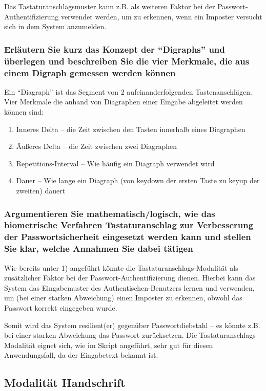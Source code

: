\documentclass{article}
\begin{document}
Das Tastaturanschlagsmuster kann z.B. als weiteren Faktor bei der Passwort-Authentifizierung verwendet werden, um zu 
erkennen, wenn ein Imposter versucht sich in dem System anzumelden.

\subsubsection{Erläutern Sie kurz das Konzept der ``Digraphs'' und überlegen und beschreiben Sie die vier Merkmale, die aus einem Digraph gemessen werden können}

Ein ``Diagraph'' ist das Segment von 2 aufeinanderfolgenden Tastenanschlägen.
Vier Merkmale die anhand von Diagraphen einer Eingabe abgeleitet werden können sind:

\begin{enumerate}
	\item Inneres Delta – die Zeit zwischen den Tasten innerhalb eines Diagraphen
	\item Äußeres Delta – die Zeit zwischen zwei Diagraphen
	\item Repetitions-Interval – Wie häufig ein Diagraph verwendet wird
	\item Dauer – Wie lange ein Diagraph (von keydown der ersten Taste zu keyup der zweiten) dauert
\end{enumerate}

\subsubsection{Argumentieren Sie mathematisch/logisch, wie das biometrische Verfahren Tastaturanschlag zur Verbesserung der Passwortsicherheit eingesetzt werden kann und stellen Sie klar, welche Annahmen Sie dabei tätigen}

Wie bereits unter 1) angeführt könnte die Tastaturanschlags-Modalität als zusätzlicher Faktor bei der 
Passwort-Authentifizierung dienen. Hierbei kann das System das Eingabemuster des Authentischen-Benutzers lernen und
verwenden, um (bei einer starken Abweichung) einen Imposter zu erkennen, obwohl das Passwort korrekt eingegeben wurde.

Somit wird das System resilient(er) gegenüber Passwortdiebstahl – es könnte z.B. bei einer starken Abweichung das 
Passwort zurücksetzen. Die Tastaturanschlags-Modalität eignet sich, wie im Skript angeführt, sehr gut für diesen
Anwendungsfall, da der Eingabetext bekannt ist.

\subsection{Modalität Handschrift}
\end{document}
